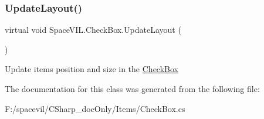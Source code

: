\mbox{\label{class_space_v_i_l_1_1_check_box_a03402e85defa2b269c933b9000d70835}} 
\subsubsection{\texorpdfstring{Update\+Layout()}{UpdateLayout()}}
{\footnotesize\ttfamily virtual void Space\+V\+I\+L.\+Check\+Box.\+Update\+Layout (\begin{DoxyParamCaption}{ }\end{DoxyParamCaption})\hspace{0.3cm}{\ttfamily [virtual]}}



Update items position and size in the \mbox{\hyperlink{class_space_v_i_l_1_1_check_box}{Check\+Box}} 



The documentation for this class was generated from the following file\+:\begin{DoxyCompactItemize}
\item 
F\+:/spacevil/\+C\+Sharp\+\_\+doc\+Only/\+Items/Check\+Box.\+cs\end{DoxyCompactItemize}
